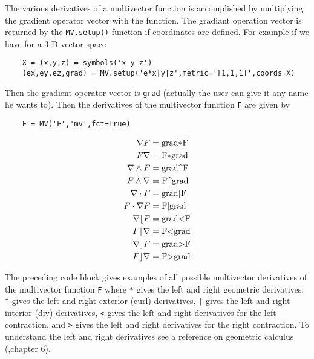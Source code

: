 \documentclass[10pt]{article}
\newcommand{\W}{\wedge}
\newcommand{\T}[1]{\texttt{#1}}
\begin{document}
The various derivatives of a multivector function is accomplished by
multiplying the gradient operator vector with the function.  The gradiant
operation vector is returned by the \T{MV.setup()} function if coordinates
are defined.  For example if we have for a 3-D vector space

\begin{lstlisting}
    X = (x,y,z) = symbols('x y z')
    (ex,ey,ez,grad) = MV.setup('e*x|y|z',metric='[1,1,1]',coords=X)
\end{lstlisting}

Then the gradient operator vector is \T{grad} (actually the user can give
it any name he wants to).  Then the derivatives of the multivector
function \T{F} are given by

\begin{lstlisting}
    F = MV('F','mv',fct=True)
\end{lstlisting}
      \begin{align}
            \nabla F &=  \mbox{\lstinline!grad*F!} \\
            F \nabla &=  \mbox{\lstinline!F*grad!} \\
            \nabla \W F &=  \mbox{\lstinline!grad^F!} \\
            F \W \nabla &=  \mbox{\lstinline!F^grad!} \\
            \nabla \cdot F &=  \mbox{\lstinline!grad|F!} \\
            F \cdot \nabla F &=  \mbox{\lstinline!F|grad!} \\
            \nabla \lfloor F &=  \mbox{\lstinline!grad<F!} \\
            F \lfloor \nabla &=  \mbox{\lstinline!F<grad!} \\
            \nabla \rfloor F &=  \mbox{\lstinline!grad>F!} \\
            F \rfloor \nabla &= \mbox{\lstinline!F>grad!}
      \end{align}

The preceding code block gives examples of all possible multivector
derivatives of the multivector function \T{F} where \T{*} gives the left and
right geometric derivatives, \T{\^} gives the left and right exterior (curl)
derivatives, \T{|} gives the left and right interior (div) derivatives,
\T{<} gives the left and right derivatives for the left contraction, and
\T{>} gives the left and right derivatives for the right contraction.  To
understand the left and right derivatives see a reference on geometric
calculus (\cite{Doran},chapter 6).
\end{document}
